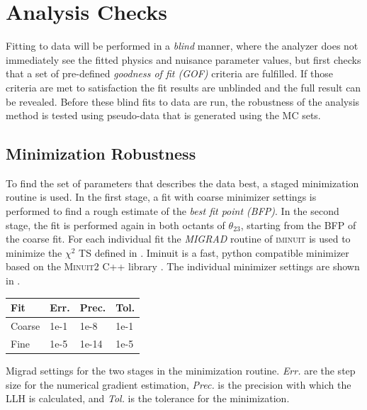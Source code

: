 \section{Analysis Checks}

Fitting to data will be performed in a \textit{blind} manner, where the analyzer does not immediately see the fitted physics and nuisance parameter values, but first checks that a set of pre-defined \textit{goodness of fit (GOF)} criteria are fulfilled. If those criteria are met to satisfaction the fit results are unblinded and the full result can be revealed. Before these blind fits to data are run, the robustness of the analysis method is tested using pseudo-data that is generated using the MC sets.


\subsection{Minimization Robustness} 

To find the set of parameters that describes the data best, a staged minimization routine is used. In the first stage, a fit with coarse minimizer settings is performed to find a rough estimate of the \textit{best fit point (BFP)}. In the second stage, the fit is performed again in both octants of $\theta_{23}$, starting from the BFP of the coarse fit. For each individual fit the \textit{MIGRAD} routine of \textsc{iminuit}  is used to minimize the $\chi^2$ TS defined in . Iminuit is a fast, python compatible minimizer based on the \textsc{Minuit2} C++ library . The individual minimizer settings are shown in .

\begin{margintable}
    \small
        \begin{tabular}{ llll }
        \hline\hline
        \textbf{Fit} & \textbf{Err.} & \textbf{Prec.} & \textbf{Tol.} \\        
        \hline\hline    
        Coarse & 1e-1 & 1e-8 & 1e-1 \\
        Fine & 1e-5 & 1e-14 & 1e-5 \\    
        \hline
        \end{tabular}
    \caption[Staged minimization routine settings]{Migrad settings for the two stages in the minimization routine. \textit{Err.} are the step size for the numerical gradient estimation, \textit{Prec.} is the precision with which the LLH is calculated, and \textit{Tol.} is the tolerance for the minimization.}
\end{margintable}

